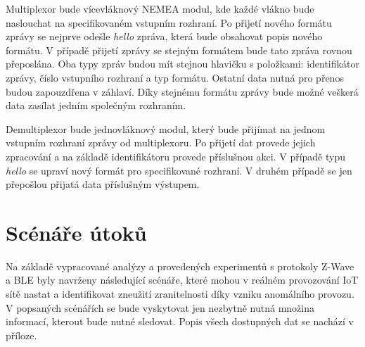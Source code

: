  Multiplexor bude vícevláknový NEMEA modul, kde každé vlákno bude naslouchat na specifikovaném
 vstupním rozhraní. Po přijetí nového formátu zprávy se nejprve odešle \textit{hello} zpráva, která
 bude obsahovat popis nového formátu. V případě přijetí zprávy se stejným formátem bude tato 
 zpráva rovnou přeposlána. Oba typy zpráv budou mít stejnou hlavičku s položkami: 
 identifikátor zprávy, 
 číslo vstupního rozhraní a typ formátu. Ostatní data nutná pro přenos budou zapouzdřena v 
 záhlaví. Díky stejnému formátu zprávy bude možné veškerá data zasílat jedním společným rozhraním.
 
 Demultiplexor bude jednovláknový modul, který bude přijímat na jednom vstupním rozhraní zprávy
 od multiplexoru. Po přijetí dat provede jejich zpracování a na základě identifikátoru 
 provede příslušnou akci. V případě typu \textit{hello} se upraví nový formát pro specifikované 
 rozhraní. V druhém případě se jen přepošlou přijatá data příslušným výstupem.
 
 \section{Scénáře útoků}
 Na základě vypracované analýzy a provedených experimentů s protokoly Z-Wave a BLE byly navrženy
 následující scénáře, které mohou v reálném provozování IoT sítě nastat a identifikovat zneužití
 zranitelnosti díky vzniku anomálního provozu. V popsaných scénářích se bude vyskytovat jen nezbytně
 nutná množina informací, kterout bude nutné sledovat. Popis všech dostupných dat se nachází v příloze.
 
